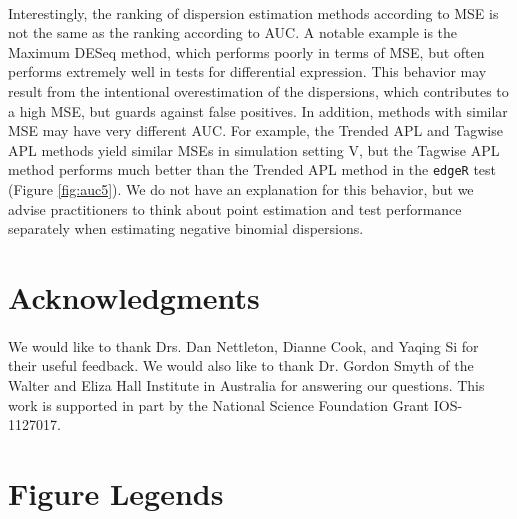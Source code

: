 \documentclass[10pt]{article}
\begin{document}
\paragraph{} \indent Interestingly, the ranking of dispersion estimation methods according to MSE is not the same as the ranking according to AUC. A notable example is the Maximum DESeq method, which performs poorly in terms of MSE, but often performs extremely well in tests for differential expression. This behavior may result from the intentional overestimation of the dispersions, which contributes to a high MSE, but guards against false positives. {\color{blue} In addition, methods with similar MSE may %
 have very different AUC. %
 For example, the Trended APL and Tagwise APL methods yield similar MSEs in simulation setting V, but the Tagwise APL method performs much better than the Trended APL method in the {\tt edgeR} test (Figure \ref{fig:auc5}). We do not have an explanation for this behavior, but we advise practitioners to think about point estimation and test performance separately when estimating negative binomial dispersions.} %

\section*{Acknowledgments}

\paragraph{} \indent We would like to thank Drs. Dan Nettleton, Dianne Cook, and Yaqing Si for their useful feedback. We would also like to thank Dr. Gordon Smyth of the Walter and Eliza Hall Institute in Australia for answering our questions. This work is supported in part by the National Science Foundation Grant IOS-1127017. 



\section*{Figure Legends}
\end{document}
